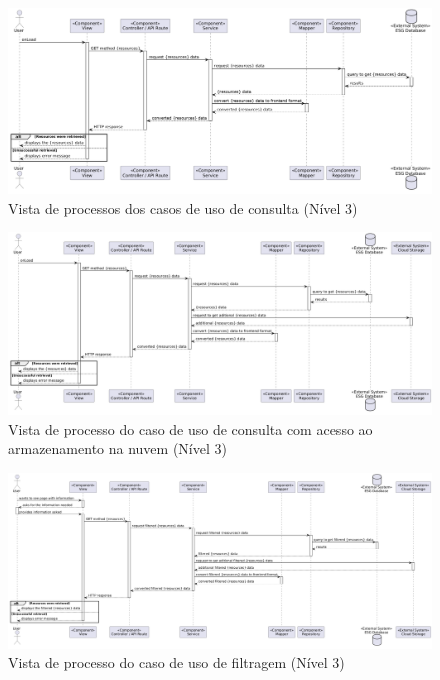 \begin{figure}[H]
\centering
\includegraphics[width=\linewidth]{frontmatter/assets/diagrams/Process Views/LVL3/uc134-lvl3.png}
\caption{Vista de processos dos casos de uso de consulta (Nível 3)}
\label{fig:UC134-lvl3}
\end{figure}


\begin{figure}[H]
\centering
\includegraphics[width=\linewidth]{frontmatter/assets/diagrams/Process Views/LVL3/uc-05-lvl3.png}
\caption{Vista de processo do caso de uso de consulta com acesso ao armazenamento na nuvem (Nível 3)}
\label{fig:UC5-lvl3}
\end{figure}


\begin{figure}[H]
\centering
\includegraphics[width=\linewidth]{frontmatter/assets/diagrams/Process Views/LVL3/uc-02-lvl3.png}
\caption{Vista de processo do caso de uso de filtragem (Nível 3)}
\label{fig:UC2-lvl3}
\end{figure}

